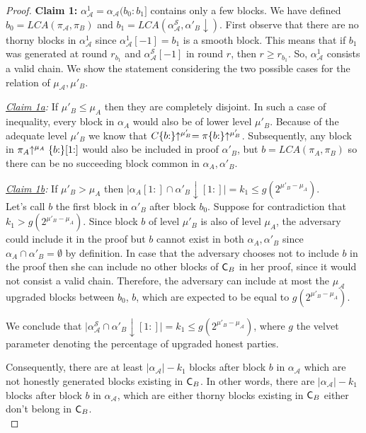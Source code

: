 \begin{proof}
\textbf{Claim 1:} $\alpha_\mathcal{A}^1 = \alpha_\mathcal{A}(b_0 : b_1]$ contains only a few blocks. We have defined $b_0 = LCA(\pi_\mathcal{A}, \pi_B)$ and $b_1 = LCA(\alpha^{\mathcal{S}}_\mathcal{A}, \alpha'_B \downarrow)$. First observe that there are no thorny blocks in $\alpha_\mathcal{A}^1$ since $\alpha_\mathcal{A}^1[-1] = b_1$ is a smooth block. This means that if $b_1$ was generated at round $r_{b_1}$ and $\alpha^{\mathcal{S}}_\mathcal{A}[-1]$ in round $r$, then $r \geq r_{b_1}$. So, $\alpha_\mathcal{A}^1$ consists a valid chain. We show the statement considering the two possible cases for the relation of $\mu_\mathcal{A}, \mu'_B$.

\textit{\underline{Claim 1a}:} If $\mu'_B \leq \mu_A$ then they are completely disjoint. In such a case of inequality, every block in $\alpha_A$ would also be of lower level $\mu'_B$. Because of the adequate level $\mu'_B$ we know that $C\{b{:}\}\negthickspace\uparrow^{\mu'_B} = \pi\{b{:}\}\negthickspace\uparrow^{\mu'_B}$\cite{nipopows}. Subsequently, any block in $\pi_A\negthickspace\uparrow^{\mu_A}\{b{:}\}[1{:}]$ would also be included in proof $\alpha'_B$, but $b=LCA(\pi_A, \pi_B)$ so there can be no succeeding block common in $\alpha_A, \alpha'_B$.

\textit{\underline{Claim 1b}:} If  $\mu'_B > \mu_A$ then $\lvert \alpha_A[1{:}]  \cap \alpha'_B\downarrow[1{:}] \rvert = k_1 \leq g(2^{\mu'_B - \mu_A})$.\\
Let's call $b$ the first block in $\alpha'_B$ after block $b_0$. Suppose for contradiction that $k_1 > g(2^{\mu'_B - \mu_A})$.  Since block $b$ of level $\mu'_B$ is also of level $\mu_A$, the adversary could include it in the proof but $b$ cannot exist in both $\alpha_A, \alpha'_B$ since $\alpha_A \cap \alpha'_B = \emptyset$ by definition. In case that the adversary chooses not to include $b$ in the proof then she can include no other blocks of $\mathsf{C}_B$ in her proof, since it would not consist a valid chain. Therefore, the adversary can include at most the $\mu_\mathcal{A}$ upgraded  blocks  between  $b_0$, $b$, which are expected to be equal to $g(2^{\mu'_B - \mu_A})$.

We conclude that $\lvert \alpha^{\mathcal{S}}_\mathcal{A} \cap \alpha'_B\downarrow[1{:}] \rvert = k_{1} \leq g(2^{\mu'_B - \mu_\mathcal{A}}) $, where $g$ the velvet parameter denoting the percentage of upgraded honest parties.

Consequently, there are at least $\lvert\alpha_\mathcal{A}\rvert - k_1$ blocks after block $b$ in $\alpha_\mathcal{A}$ which are not honestly generated blocks existing in $\mathsf{C}_B$. In other words, there are $\vert \alpha_\mathcal{A} \vert - k_1$ blocks after block $b$ in $\alpha_\mathcal{A}$, which are either thorny blocks existing in $\mathsf{C}_B$ either don't belong in $\mathsf{C}_B$.\\


\end{proof}
